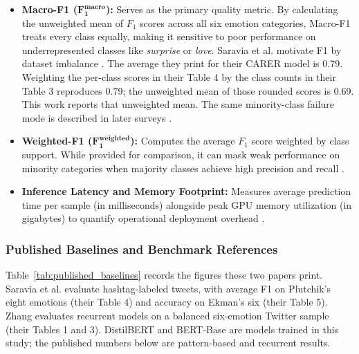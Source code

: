 \documentclass[conference]{IEEEtran}
\begin{document}
\begin{itemize}
    \item \textbf{Macro-F1 ($\mathbf{F_1^{\text{macro}}}$):} Serves as the primary quality metric. By calculating the unweighted mean of $F_1$ scores across all six emotion categories, Macro-F1 treats every class equally, making it sensitive to poor performance on underrepresented classes like \textit{surprise} or \textit{love}. Saravia et al. motivate F1 by dataset imbalance \cite{saravia2018carer}. The average they print for their CARER model is 0.79. Weighting the per-class scores in their Table 4 by the class counts in their Table 3 reproduces 0.79; the unweighted mean of those rounded scores is 0.69. This work reports that unweighted mean. The same minority-class failure mode is described in later surveys \cite{maruf2024challenges}.
    \item \textbf{Weighted-F1 ($\mathbf{F_1^{\text{weighted}}}$):} Computes the average $F_1$ score weighted by class support. While provided for comparison, it can mask weak performance on minority categories when majority classes achieve high precision and recall \cite{chakriswaran2019emotion}.
    \item \textbf{Inference Latency and Memory Footprint:} Measures average prediction time per sample (in milliseconds) alongside peak GPU memory utilization (in gigabytes) to quantify operational deployment overhead \cite{nwaiwu2025peft}.
\end{itemize}

\subsubsection{Published Baselines and Benchmark References}
Table~\ref{tab:published_baselines} records the figures these two papers print. Saravia et al. \cite{saravia2018carer} evaluate hashtag-labeled tweets, with average F1 on Plutchik's eight emotions (their Table 4) and accuracy on Ekman's six (their Table 5). Zhang \cite{zhang2024comparative} evaluates recurrent models on a balanced six-emotion Twitter sample (their Tables 1 and 3). DistilBERT and BERT-Base are models trained in this study; the published numbers below are pattern-based and recurrent results.
\end{document}
